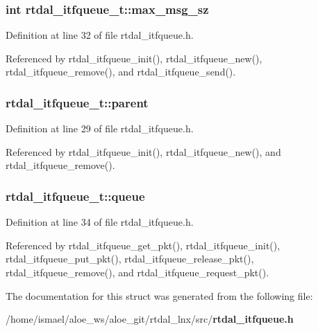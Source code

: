 \subsubsection[{max\-\_\-msg\-\_\-sz}]{\setlength{\rightskip}{0pt plus 5cm}int rtdal\-\_\-itfqueue\-\_\-t\-::max\-\_\-msg\-\_\-sz}\label{structrtdal__itfqueue__t_a8740e3cafa1b4c880fa85447d0944fc8}


Definition at line 32 of file rtdal\-\_\-itfqueue.\-h.



Referenced by rtdal\-\_\-itfqueue\-\_\-init(), rtdal\-\_\-itfqueue\-\_\-new(), rtdal\-\_\-itfqueue\-\_\-remove(), and rtdal\-\_\-itfqueue\-\_\-send().

\subsubsection[{parent}]{ rtdal\-\_\-itfqueue\-\_\-t\-::parent}\label{structrtdal__itfqueue__t_acbcc79b87ed4be02124936c1480057ea}


Definition at line 29 of file rtdal\-\_\-itfqueue.\-h.



Referenced by rtdal\-\_\-itfqueue\-\_\-init(), rtdal\-\_\-itfqueue\-\_\-new(), and rtdal\-\_\-itfqueue\-\_\-remove().

\subsubsection[{queue}]{ rtdal\-\_\-itfqueue\-\_\-t\-::queue}\label{structrtdal__itfqueue__t_a69fcd4b952880287f117e19ee7e0fb4b}


Definition at line 34 of file rtdal\-\_\-itfqueue.\-h.



Referenced by rtdal\-\_\-itfqueue\-\_\-get\-\_\-pkt(), rtdal\-\_\-itfqueue\-\_\-init(), rtdal\-\_\-itfqueue\-\_\-put\-\_\-pkt(), rtdal\-\_\-itfqueue\-\_\-release\-\_\-pkt(), rtdal\-\_\-itfqueue\-\_\-remove(), and rtdal\-\_\-itfqueue\-\_\-request\-\_\-pkt().



The documentation for this struct was generated from the following file\-:\begin{DoxyCompactItemize}
\item 
/home/ismael/aloe\-\_\-ws/aloe\-\_\-git/rtdal\-\_\-lnx/src/{\bf rtdal\-\_\-itfqueue.\-h}\end{DoxyCompactItemize}
